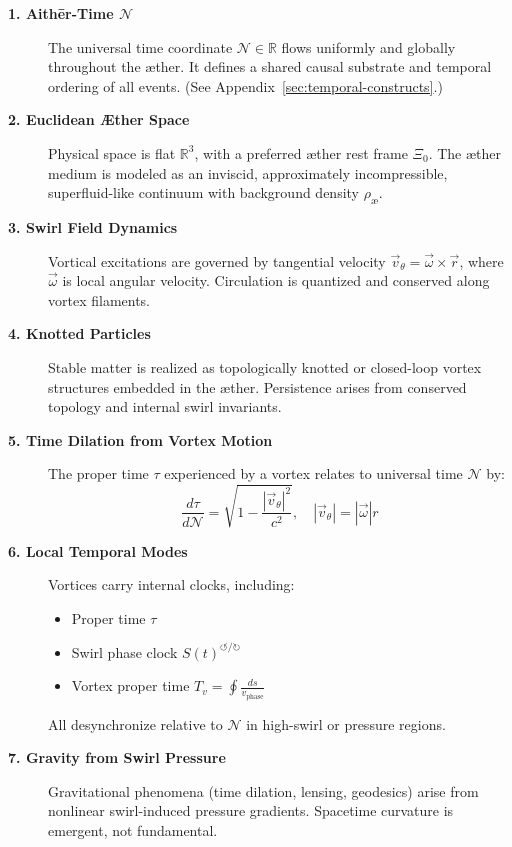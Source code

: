 \documentclass[12pt]{article}
\begin{document}
    \begin{description}
        \item[\textbf{1. Aithēr-Time \(\mathcal{N}\)}]%
        The universal time coordinate \( \mathcal{N} \in \mathbb{R} \) flows uniformly and globally throughout the æther. It defines a shared causal substrate and temporal ordering of all events. (See Appendix~\ref{sec:temporal-constructs}.)

        \item[\textbf{2. Euclidean Æther Space}]%
        Physical space is flat \( \mathbb{R}^3 \), with a preferred æther rest frame \( \Xi_0 \). The æther medium is modeled as an inviscid, approximately incompressible, superfluid-like continuum with background density \( \rho_{\text{\ae}} \).

        \item[\textbf{3. Swirl Field Dynamics}]%
        Vortical excitations are governed by tangential velocity \( \vec{v}_\theta = \vec{\omega} \times \vec{r} \), where \( \vec{\omega} \) is local angular velocity. Circulation is quantized and conserved along vortex filaments.

        \item[\textbf{4. Knotted Particles}]%
        Stable matter is realized as topologically knotted or closed-loop vortex structures embedded in the æther. Persistence arises from conserved topology and internal swirl invariants.

        \item[\textbf{5. Time Dilation from Vortex Motion}]%
        The proper time \( \tau \) experienced by a vortex relates to universal time \( \mathcal{N} \) by:
        \begin{equation}
            \boxed{
                \frac{d\tau}{d\mathcal{N}} = \sqrt{1 - \frac{|\vec{v}_\theta|^2}{c^2}}, \quad |\vec{v}_\theta| = |\vec{\omega}| r
            }
            \label{eq:tau-dilation}
        \end{equation}


        \item[\textbf{6. Local Temporal Modes}]%
        Vortices carry internal clocks, including:
        \begin{itemize}
            \item Proper time \( \tau \)
            \item Swirl phase clock \( S(t)^{\circlearrowleft\!/\!\circlearrowright} \)
            \item Vortex proper time \( T_v = \oint \frac{ds}{v_\text{phase}} \)
        \end{itemize}
        All desynchronize relative to \( \mathcal{N} \) in high-swirl or pressure regions.

        \item[\textbf{7. Gravity from Swirl Pressure}]%
        Gravitational phenomena (time dilation, lensing, geodesics) arise from nonlinear swirl-induced pressure gradients. Spacetime curvature is emergent, not fundamental.
    \end{description}
\end{document}
